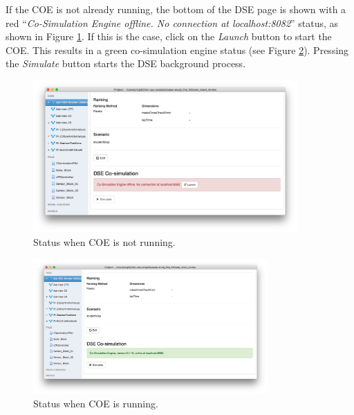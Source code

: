 If the COE is not already running, the bottom of the DSE page is shown with a red ``\emph{Co-Simulation Engine offline. No connection at localhost:8082}'' status, as shown in Figure \ref{fig:dse:launch:dsesection}.
%
If this is the case, click on the \emph{Launch} button to start the COE.
%
This results in a green co-simulation engine status (see Figure \ref{fig:dse:launch:coerunning}). Pressing the \emph{Simulate} button starts the DSE background process.
%
%
%
\begin{figure}[ht]
	\centering
	\includegraphics[width=0.9\textwidth]{figures/dse/launch-dsesection}
	\caption{Status when COE is not running.}\label{fig:dse:launch:dsesection}
\end{figure}
%
%
%
\begin{figure}[ht]
	\centering
	\includegraphics[width=0.8\textwidth]{figures/dse/launch-coerunning}
	\caption{Status when COE is running.}\label{fig:dse:launch:coerunning}
\end{figure}
%
%
%
%
%
%
%
